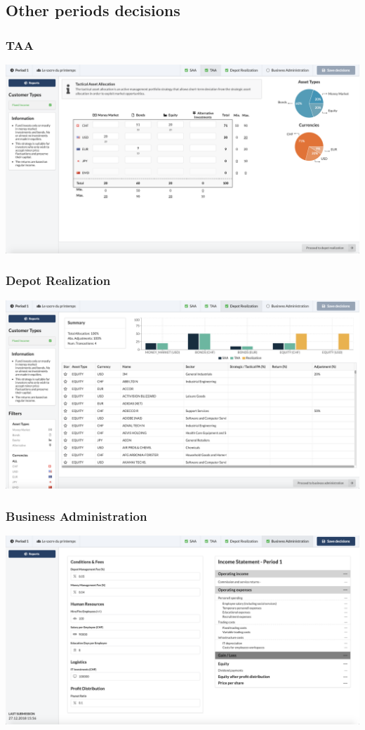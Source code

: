 \subsection{Other periods decisions}
\subsubsection{TAA}
\begin{center}
  \includegraphics[scale=0.2]{img/application-overview/teams/taa.png}
\end{center}

\subsubsection{Depot Realization}
\begin{center}
  \includegraphics[scale=0.2]{img/application-overview/teams/depot_realization.png}
\end{center}

\subsubsection{Business Administration}
\begin{center}
  \includegraphics[scale=0.2]{img/application-overview/teams/business.png}
\end{center}
